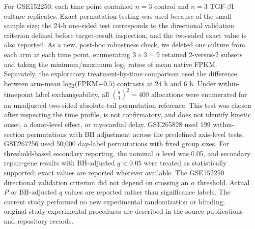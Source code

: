 \documentclass[preprint,11pt]{elsarticle}
\newcommand{\tgfb}{TGF-$\beta$1}
\begin{document}
For GSE152250, each time point contained $n=3$ control and $n=3$ \tgfb{} culture replicates. Exact permutation testing was used because of the small sample size; the 24-h one-sided test corresponds to the directional validation criterion defined before target-result inspection, and the two-sided exact value is also reported. As a new, post-hoc robustness check, we deleted one culture from each arm at each time point, enumerating $3\times3=9$ retained 2-versus-2 subsets and taking the minimum/maximum log$_2$ ratios of mean native FPKM. Separately, the exploratory treatment-by-time comparison used the difference between arm-mean log$_2$(FPKM$+0.5$) contrasts at 24 h and 6 h. Under within-timepoint label exchangeability, all $\binom{6}{3}^2=400$ allocations were enumerated for an unadjusted two-sided absolute-tail permutation reference. This test was chosen after inspecting the time profile, is not confirmatory, and does not identify kinetic onset, a donor-level effect, or myocardial delay. GSE265828 used 199 within-section permutations with BH adjustment across the predefined axis-level tests. GSE267256 used 50,000 day-label permutations with fixed group sizes. For threshold-based secondary reporting, the nominal $\alpha$ level was 0.05, and secondary repair-gene results with BH-adjusted $q<0.05$ were treated as statistically supported; exact values are reported wherever available. The GSE152250 directional validation criterion did not depend on crossing an $\alpha$ threshold. Actual $P$ or BH-adjusted $q$ values are reported rather than significance labels. The current study performed no new experimental randomization or blinding; original-study experimental procedures are described in the source publications and repository records.
\end{document}
